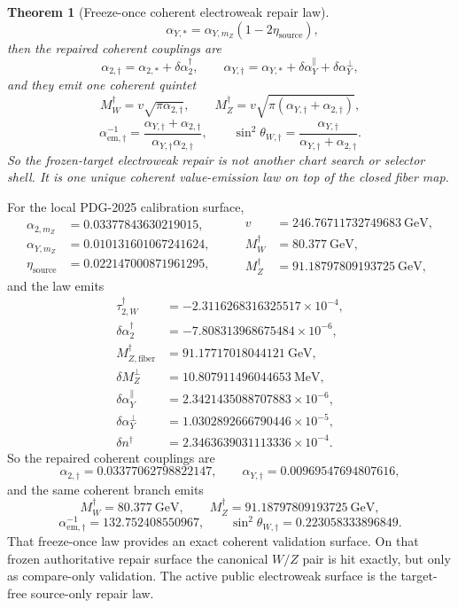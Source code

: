 \documentclass[11pt]{article}
\newtheorem{theorem}{Theorem}[section]
\begin{document}
\begin{theorem}[Freeze-once coherent electroweak repair law]
\[\qquad
\alpha_{Y,*}=\alpha_{Y,m_Z}(1-2\eta_{\mathrm{source}}),
\]
then the repaired coherent couplings are
\[
\alpha_{2,\dagger}=\alpha_{2,*}+\delta\alpha_2^\dagger,
\qquad
\alpha_{Y,\dagger}=\alpha_{Y,*}+\delta\alpha_Y^\parallel+\delta\alpha_Y^\perp,
\]
and they emit one coherent quintet
\[
M_W^\dagger=v\sqrt{\pi\alpha_{2,\dagger}},
\qquad
M_Z^\dagger=v\sqrt{\pi(\alpha_{Y,\dagger}+\alpha_{2,\dagger})},
\]
\[
\alpha_{\mathrm{em},\dagger}^{-1}
=
\frac{\alpha_{Y,\dagger}+\alpha_{2,\dagger}}
{\alpha_{Y,\dagger}\alpha_{2,\dagger}},
\qquad
\sin^2\theta_{W,\dagger}
=
\frac{\alpha_{Y,\dagger}}{\alpha_{Y,\dagger}+\alpha_{2,\dagger}}.
\]
So the frozen-target electroweak repair is not another chart search or selector shell. It is one
unique coherent value-emission law on top of the closed fiber map.
\end{theorem}

For the local PDG-2025 calibration surface,
\[
\begin{aligned}
\alpha_{2,m_Z}&=0.03377843630219015,\\
\alpha_{Y,m_Z}&=0.010131601067241624,\\
\eta_{\mathrm{source}}&=0.022147000871961295,
\end{aligned}
\qquad
\begin{aligned}
v&=246.76711732749683~\mathrm{GeV},\\
M_W^\dagger&=80.377~\mathrm{GeV},\\
M_Z^\dagger&=91.18797809193725~\mathrm{GeV},
\end{aligned}
\]
and the law emits
\[
\begin{aligned}
\tau_{2,W}^\dagger&=-2.3116268316325517\times10^{-4},\\
\delta\alpha_2^\dagger&=-7.808313968675484\times10^{-6},\\
M_{Z,\mathrm{fiber}}^\dagger&=91.17717018044121~\mathrm{GeV},\\
\delta M_Z^\perp&=10.807911496044653~\mathrm{MeV},\\
\delta\alpha_Y^\parallel&=2.3421435088707883\times10^{-6},\\
\delta\alpha_Y^\perp&=1.0302892666790446\times10^{-5},\\
\delta n^\dagger&=2.3463639031113336\times10^{-4}.
\end{aligned}
\]
So the repaired coherent couplings are
\[
\alpha_{2,\dagger}=0.03377062798822147,
\qquad
\alpha_{Y,\dagger}=0.00969547694807616,
\]
and the same coherent branch emits
\[
M_W^\dagger=80.377~\mathrm{GeV},
\qquad
M_Z^\dagger=91.18797809193725~\mathrm{GeV},
\]
\[
\alpha_{\mathrm{em},\dagger}^{-1}=132.752408550967,
\qquad
\sin^2\theta_{W,\dagger}=0.223058333896849.
\]
That freeze-once law provides an exact coherent validation surface. On that frozen authoritative
repair surface the canonical \(W/Z\) pair is hit exactly, but only as compare-only validation.
The active public electroweak surface is the target-free source-only repair law.
\end{document}

